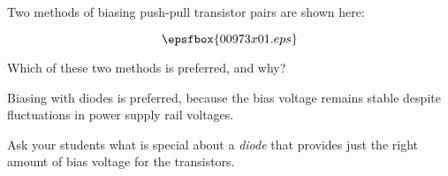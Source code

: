 

Two methods of biasing push-pull transistor pairs are shown here:

$$\epsfbox{00973x01.eps}$$

Which of these two methods is preferred, and why?







Biasing with diodes is preferred, because the bias voltage remains stable despite fluctuations in power supply rail voltages.







Ask your students what is special about a {\it diode} that provides just the right amount of bias voltage for the transistors.  




